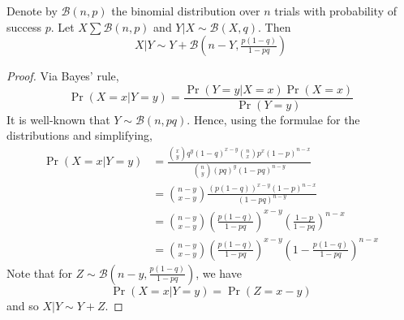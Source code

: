 \documentclass[final,12pt]{colt2022} %
\begin{document}
\begin{lemma} \label{lemma:coinflip}
Denote by $\mathcal B(n, p)$ the binomial distribution over $n$ trials with probability of success $p$. Let $X \sum \mathcal B(n, p)$ and $Y | X \sim \mathcal B(X, q)$. Then
\[X | Y \sim Y + \mathcal B(n - Y, \tfrac{p(1-q)}{1-pq})\]
\end{lemma}
\begin{proof}
Via Bayes' rule,
\[\Pr(X=x | Y = y) = \frac{\Pr(Y = y | X = x) \Pr(X = x)}{\Pr(Y = y)}\]
It is well-known that $Y \sim \mathcal B(n, pq)$. Hence, using the formulae for the distributions and simplifying,
\begin{align*}
    \Pr(X = x | Y = y) &= \frac{{x \choose y} q^y (1-q)^{x-y} {n \choose x} p^x (1-p)^{n-x}}{{n \choose y} (pq)^y (1-pq)^{n-y}}\\
    &= {n-y \choose x-y} \frac{(p(1-q))^{x-y} (1-p)^{n-x}}{(1-pq)^{n-y}}\\
    &= {n-y \choose x-y} \left(\frac{p(1-q)}{1-pq}\right)^{x-y} \left(\frac{1-p}{1-pq}\right)^{n-x}\\
    &= {n-y \choose x-y} \left(\frac{p(1-q)}{1-pq}\right)^{x-y} \left(1 - \frac{p(1-q)}{1-pq}\right)^{n-x}
\end{align*} Note that for $Z \sim \mathcal B(n - y, \tfrac{p(1-q)}{1-pq})$, we have
\[\Pr(X = x | Y = y) = \Pr(Z = x-y)\]
and so $X | Y \sim Y + Z$. 
\end{proof}
\end{document}
